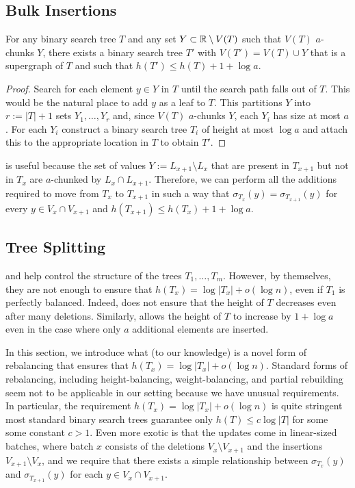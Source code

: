 \documentclass[kpfonts]{patmorin}
\begin{document}
\subsection{Bulk Insertions}

\begin{lem}
  For any binary search tree $T$ and any set $Y\subset\mathbb{R}\setminus V(T)$ such that $V(T)$ $a$-chunks $Y$, there exists a binary search tree $T'$ with $V(T')=V(T)\cup Y$ that is a supergraph of $T$ and such that $h(T')\le h(T)+1+\log a$.
\end{lem}

\begin{proof}
  Search for each element $y\in Y$ in $T$ until the search path falls out of $T$.  This would be the natural place to add $y$ as a leaf to $T$.  This partitions $Y$ into $r:=|T|+1$ sets $Y_1,\ldots,Y_r$ and, since $V(T)$ $a$-chunks $Y$, each $Y_i$ has size at most $a$.  For each $Y_i$ construct a binary search tree $T_i$ of height at most $\log a$ and attach this to the appropriate location in $T$ to obtain $T'$.
\end{proof}

 is useful because the set of values $Y:=L_{x+1}\setminus L_x$ that are present in $T_{x+1}$ but not in $T_x$ are $a$-chunked by $L_x\cap L_{x+1}$. Therefore, we can perform all the additions required to move from $T_x$ to $T_{x+1}$ in such a way that $\sigma_{T_x}(y)=\sigma_{T_{x+1}}(y)$ for every $y\in V_x\cap V_{x+1}$ and $h(T_{x+1})\le h(T_x)+1+\log a$.  

\subsection{Tree Splitting}

 and  help control the structure of the trees $T_1,\ldots,T_m$.  However, by themselves, they are not enough to ensure that $h(T_x)=\log|T_x|+o(\log n)$, even if $T_1$ is perfectly balanced.  Indeed,  does not ensure that the height of $T$ decreases even after many deletions.  Similarly,  allows the height of $T$ to increase by $1+\log a$ even in the case where only $a$ additional elements are inserted.  

In this section, we introduce what (to our knowledge) is a novel form of rebalancing that ensures that $h(T_x)=\log|T_x|+o(\log n)$.  Standard forms of rebalancing, including height-balancing, weight-balancing, and partial rebuilding seem not to be applicable in our setting because we have unusual requirements.  In particular, the requirement $h(T_x)=\log|T_x|+o(\log n)$ is quite stringent most standard binary search trees guarantee only $h(T)\le c\log |T|$ for some some constant $c>1$.  Even more exotic is that the updates come in linear-sized batches, where batch $x$ consists of the deletions $V_x\setminus V_{x+1}$ and the insertions $V_{x+1}\setminus V_x$, and we require that there exists a simple relationship between $\sigma_{T_x}(y)$ and $\sigma_{T_{x+1}}(y)$ for each $y\in V_x\cap V_{x+1}$.     
\end{document}
